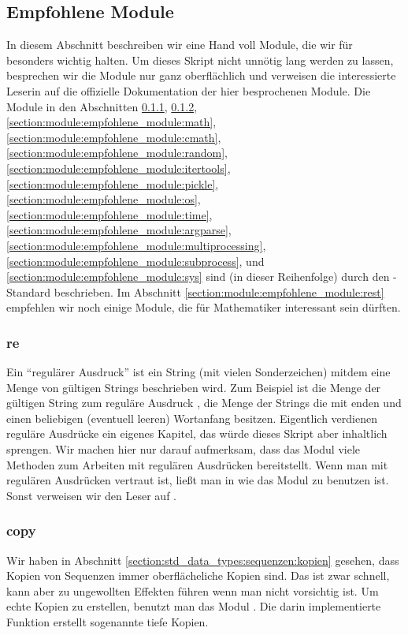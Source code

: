\subsection{Empfohlene Module}
\label{section:module:empfohlene_module}
In diesem Abschnitt beschreiben wir eine Hand voll Module, die wir für besonders wichtig halten.
Um dieses Skript nicht unnötig lang werden zu lassen, besprechen wir die Module nur ganz oberflächlich und verweisen die interessierte Leserin auf die offizielle Dokumentation der hier besprochenen Module.
Die Module in den Abschnitten \ref{section:module:empfohlene_module:re},
\ref{section:module:empfohlene_module:copy},
\ref{section:module:empfohlene_module:math},
\ref{section:module:empfohlene_module:cmath},
\ref{section:module:empfohlene_module:random},
\ref{section:module:empfohlene_module:itertools},
\ref{section:module:empfohlene_module:pickle},
\ref{section:module:empfohlene_module:os},
\ref{section:module:empfohlene_module:time},
\ref{section:module:empfohlene_module:argparse},
\ref{section:module:empfohlene_module:multiprocessing},
\ref{section:module:empfohlene_module:subprocess},
und \ref{section:module:empfohlene_module:sys}
sind (in dieser Reihenfolge) durch den \Python-Standard beschrieben.
Im Abschnitt \ref{section:module:empfohlene_module:rest} empfehlen wir noch einige Module, die für Mathematiker interessant sein dürften.


\subsubsection{re}
\label{section:module:empfohlene_module:re}
Ein ``regulärer Ausdruck'' ist ein String (mit vielen Sonderzeichen) mitdem eine Menge von gültigen Strings beschrieben wird.
Zum Beispiel ist die Menge der gültigen String zum reguläre Ausdruck , die Menge der Strings die mit  enden und einen beliebigen (eventuell leeren) Wortanfang besitzen.
Eigentlich verdienen reguläre Ausdrücke ein eigenes Kapitel, das würde dieses Skript aber inhaltlich sprengen.
Wir machen hier nur darauf aufmerksam, dass das Modul  viele Methoden zum Arbeiten mit regulären Ausdrücken bereitstellt.
Wenn man mit regulären Ausdrücken vertraut ist, ließt man in \cite[Library, Text Processing Services, Regular expression operations]{Python3} wie das Modul  zu benutzen ist.
Sonst verweisen wir den Leser auf \cite[Kapitel 33]{LottPython}.


\subsubsection{copy}
\label{section:module:empfohlene_module:copy}
Wir haben in Abschnitt \ref{section:std_data_types:sequenzen:kopien} gesehen, dass Kopien von Sequenzen immer oberflächeliche Kopien sind.
Das ist zwar schnell, kann aber zu ungewollten Effekten führen wenn man nicht vorsichtig ist.
Um echte Kopien zu erstellen, benutzt man das Modul .
Die darin implementierte Funktion  erstellt sogenannte tiefe Kopien.


